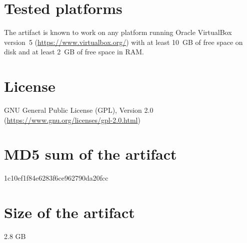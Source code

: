 \documentclass[a4paper,UKenglish]{darts}
\newenvironment{platforms}{\section{Tested platforms}}{}
\newcommand{\license}[1]{{\section{License}#1}}
\newcommand{\mdsum}[1]{{\section{MD5 sum of the artifact}#1}}
\newcommand{\artifactsize}[1]{{\section{Size of the artifact}#1}}
\begin{document}
\begin{platforms}
  The artifact is known to work on any platform running Oracle VirtualBox
  version~5 (\url{https://www.virtualbox.org/}) with at least 10~GB of free
  space on disk and at least 2~GB of free space in RAM.
\end{platforms}

\license{GNU General Public License (GPL), Version 2.0 (\url{https://www.gnu.org/licenses/gpl-2.0.html})}

\mdsum{1c10ef1f84e6283f6ce962790da20fcc}

\artifactsize{2.8 GB}
\end{document}
